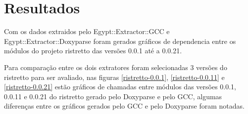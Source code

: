 \section{Resultados}

Com os dados extraidos pelo Egypt::Extractor::GCC e Egypt::Extractor::Doxyparse
foram gerados gráficos de dependencia entre os módulos do projeto ristretto das
versões 0.0.1 até a 0.0.21.


Para comparação entre os dois extratores foram selecionadas 3 versões do
ristretto para ser avaliado, nas figuras \ref{ristretto-0.0.1},
\ref{ristretto-0.0.11} e \ref{ristretto-0.0.21} estão gráficos de chamadas
entre módulos das versões 0.0.1, 0.0.11 e 0.0.21 do ristretto gerado pelo
Doxyparse e pelo GCC, algumas diferenças entre os gráficos gerados pelo GCC e
pelo Doxyparse foram notadas. 

